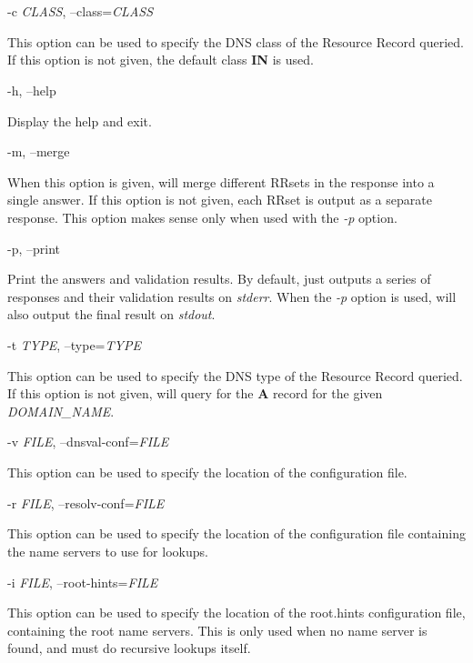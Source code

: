 \begin{description}

\item -c {\it CLASS}, --class={\it CLASS}\verb" "

This option can be used to specify the DNS class of the Resource
Record queried.  If this option is not given, the default class
{\bf IN} is used.

\item -h, --help\verb" "

Display the help and exit.

\item -m, --merge\verb" "

When this option is given,  will merge different RRsets
in the response into a single answer.  If this option is not given,
each RRset is output as a separate response.  This option makes
sense only when used with the {\it -p} option.

\item -p, --print\verb" "

Print the answers and validation results.  By default, 
just outputs a series of responses and their validation results on
{\it stderr}.  When the {\it -p} option is used,  will also
output the final result on {\it stdout}.

\item -t {\it TYPE}, --type={\it TYPE}\verb" "

This option can be used to specify the DNS type of the Resource Record
queried.  If this option is not given,  will query for the
{\bf A} record for the given {\it DOMAIN\_NAME}.

\item -v {\it FILE}, --dnsval-conf={\it FILE}\verb" "

This option can be used to specify the location of the 
configuration file.

\item -r {\it FILE}, --resolv-conf={\it FILE}\verb" "

This option can be used to specify the location of the 
configuration file containing the name servers to use for lookups.

\item -i {\it FILE}, --root-hints={\it FILE}\verb" "

This option can be used to specify the location of the root.hints
configuration file, containing the root name servers.  This is only
used when no name server is found, and  must do recursive
lookups itself.


\end{description}
